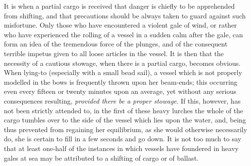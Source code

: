 It is when a partial cargo is received that danger is chiefly to be
apprehended from shifting, and that precautions should be always taken to guard
against such misfortune. Only those who have encountered a violent gale of wind,
or rather who have experienced the rolling of a vessel in a sudden calm after
the gale, can form an idea of the tremendous force of the plunges, and of the
consequent terrible impetus given to all loose articles in the vessel. It is
then that the necessity of a cautious stowage, when there is a partial cargo,
becomes obvious. When lying-to (especially with a small bead sail), a vessel
which is not properly modelled in the bows is frequently thrown upon her
beam-ends; this occurring even every fifteen or twenty minutes upon an average,
yet without any serious consequences resulting, \emph{provided there be a proper
stowage}. If this, however, has not been strictly attended to, in the first
of these heavy lurches the whole of the cargo tumbles over to the side of the
vessel which lies upon the water, and, being thus prevented from regaining her
equilibrium, as she would otherwise necessarily do, she is certain to fill in a
few seconds and go down. It is not too much to say that at least one-half of the
instances in which vessels have foundered in heavy gales at sea may be
attributed to a shifting of cargo or of ballast. 

